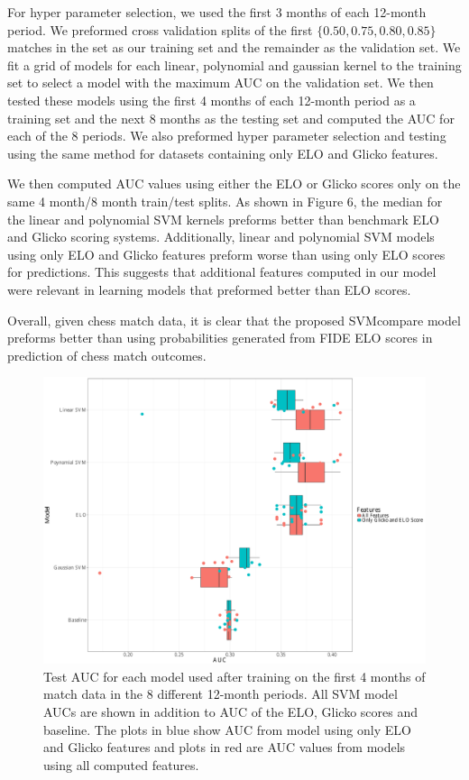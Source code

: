 \documentclass[twoside,11pt]{article}
\begin{document}
For hyper parameter selection, we used the first 3 months of each 12-month period.  We preformed cross validation splits of the first  $\{0.50,0.75,0.80,0.85\}$ matches in the set as our training set and the remainder as the validation set.  We fit a grid of models for each linear, polynomial and gaussian kernel to the training set to select a model with the maximum AUC on the validation set.  We then tested these models using the first 4 months of each 12-month period as a training set and the next 8 months as the testing set and computed the AUC for each of the 8 periods.  We also preformed hyper parameter selection and testing using the same method for datasets containing only ELO and Glicko features.

We then computed AUC values using either the ELO or Glicko scores only on the same 4 month/8 month train/test splits.  As shown in Figure 6, the median for the linear and polynomial SVM kernels preforms better than benchmark ELO and Glicko scoring systems.  Additionally, linear and polynomial SVM models using only ELO and Glicko features preform worse than using only ELO scores for predictions.  This suggests that additional features computed in our model were relevant in learning models that preformed better than ELO scores.

Overall, given chess match data, it is clear that the proposed SVMcompare model preforms better than using probabilities generated from FIDE ELO scores in prediction of chess match outcomes.

\begin{figure}[!b]
	\includegraphics[width=120mm]{AUC_chess.pdf}
	\centering
	\caption{Test AUC for each model used after training on the first 4 months of match data in the 8 different 12-month periods.  All SVM model AUCs are shown in addition to AUC of the ELO, Glicko scores and baseline.  The plots in blue show AUC from model using only ELO and Glicko features and plots in red are AUC values from models using all computed features.}
	\label{fig6}
\end{figure}
\end{document}
